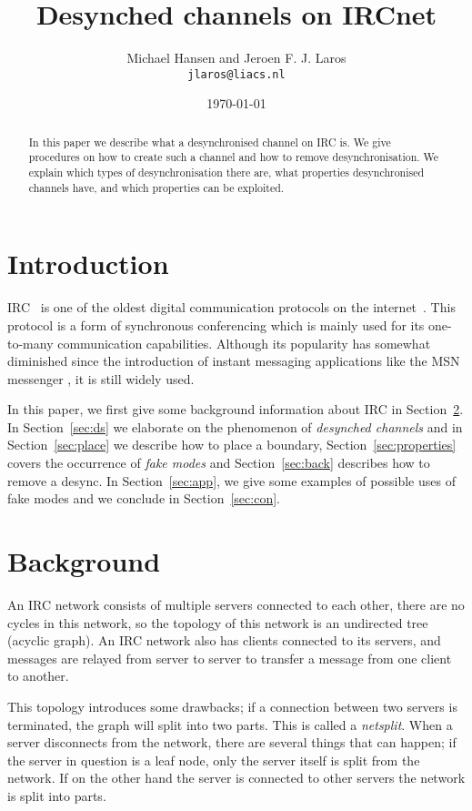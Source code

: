\documentclass{article}
\title{\Huge Desynched channels on IRCnet}
\author{Michael Hansen and Jeroen F. J. Laros\\
        \texttt{jlaros@liacs.nl}}
\date{\today}
\theoremstyle{definition}
\begin{document}
\maketitle

\begin{abstract} \noindent
In this paper we describe what a desynchronised channel on IRC is. We give
procedures on how to create such a channel and how to remove desynchronisation.
We explain which types of desynchronisation there are, what properties
desynchronised channels have, and which properties can be exploited.
\end{abstract}

\section{Introduction} \label{sec:intro}
IRC~\cite{IRC} is one of the oldest digital communication protocols on the
internet~\cite{IN}. This protocol is a form of synchronous conferencing which
is mainly used for its one-to-many communication capabilities. Although its
popularity has somewhat diminished since the introduction of instant messaging
applications \cite{IM} like the MSN messenger \cite{MSN}, it is still widely
used.

In this paper, we first give some background information about IRC in
Section~\ref{sec:bg}. In Section~\ref{sec:ds} we elaborate on the phenomenon of
\emph{desynched channels} and in Section~\ref{sec:place} we describe how to
place a boundary, Section~\ref{sec:properties} covers the occurrence of
\emph{fake modes} and Section~\ref{sec:back} describes how to remove a desync.
In Section~\ref{sec:app}, we give some examples of possible uses of fake modes
and we conclude in Section~\ref{sec:con}.

\section{Background} \label{sec:bg}
An IRC network consists of multiple servers connected to each other, there are
no cycles in this network, so the topology of this network is an undirected
tree (acyclic graph). An IRC network also has clients connected to its servers,
and messages are relayed from server to server to transfer a message from one
client to another.

This topology introduces some drawbacks; if a connection between two servers is
terminated, the graph will split into two parts. This is called a
\emph{netsplit}. When a server disconnects from the network, there are several
things that can happen; if the server in question is a leaf node, only the
server itself is split from the network. If on the other hand the server is
connected to  other servers the network is split into  parts.
\end{document}
